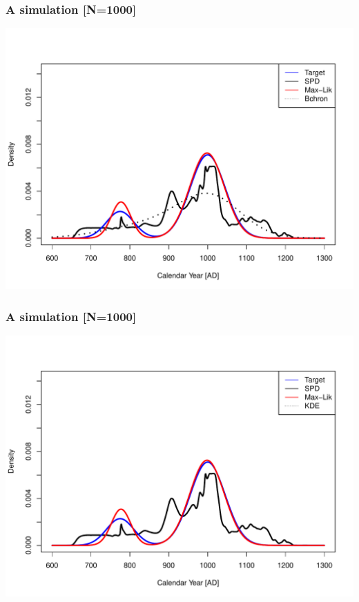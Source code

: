 \documentclass{beamer}
\begin{document}
\begin{frame}[t]
  \frametitle{A simulation [N=1000]}
    \includegraphics[height=.85\textheight]{sim_target_spd_max-lik_bchron_1000.pdf}
\end{frame}

\begin{frame}[t]
  \frametitle{A simulation [N=1000]}
    \includegraphics[height=.85\textheight]{sim_target_spd_max-lik_kde_1000.pdf}
\end{frame}
\end{document}
